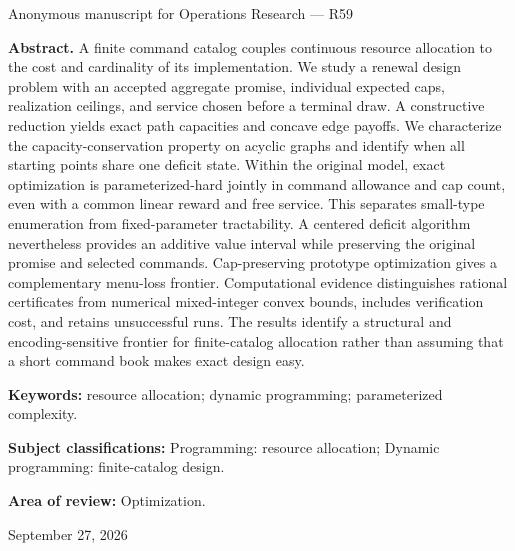 \documentclass[11pt,letterpaper]{article}
\theoremstyle{definition}\newtheorem{remark}[theorem]{Remark}
\begin{document}
\hypersetup{pageanchor=false}
\begin{titlepage}
\vspace{0.25in}Anonymous manuscript for Operations Research --- R59\par\vspace{0.2in}
\begin{minipage}{\textwidth}\textbf{Abstract.} A finite command catalog couples continuous resource allocation to the cost and cardinality of its implementation. We study a renewal design problem with an accepted aggregate promise, individual expected caps, realization ceilings, and service chosen before a terminal draw. A constructive reduction yields exact path capacities and concave edge payoffs. We characterize the capacity-conservation property on acyclic graphs and identify when all starting points share one deficit state. Within the original model, exact optimization is parameterized-hard jointly in command allowance and cap count, even with a common linear reward and free service. This separates small-type enumeration from fixed-parameter tractability. A centered deficit algorithm nevertheless provides an additive value interval while preserving the original promise and selected commands. Cap-preserving prototype optimization gives a complementary menu-loss frontier. Computational evidence distinguishes rational certificates from numerical mixed-integer convex bounds, includes verification cost, and retains unsuccessful runs. The results identify a structural and encoding-sensitive frontier for finite-catalog allocation rather than assuming that a short command book makes exact design easy.
\par\vspace{0.15in}\textbf{Keywords:} resource allocation; dynamic programming; parameterized complexity.
\par\vspace{0.1in}\textbf{Subject classifications:} Programming: resource allocation; Dynamic programming: finite-catalog design.
\par\vspace{0.1in}\textbf{Area of review:} Optimization.\end{minipage}\vfill September 27, 2026\end{titlepage}
\hypersetup{pageanchor=true}



\end{document}
